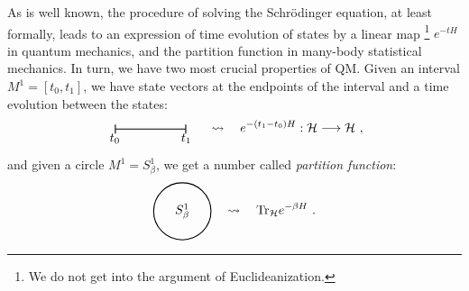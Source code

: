 As is well known, the procedure of solving the Schr\"{o}dinger equation, at least formally, leads
to an expression of time evolution of states by a linear map%
%
\footnote{We do not get into the argument of Euclideanization.}
%
$e^{-tH}$ in quantum mechanics, and the partition function in many-body
statistical mechanics. In turn, we have two most crucial properties
of QM. Given an interval $M^{1}=\left[t_{0},t_{1}\right]$, we have
state vectors at the endpoints of the interval and a time evolution
between the states:
\begin{equation}
    \begin{tikzpicture}[scale=1.0, baseline=(x.base)]    \node (x) at (0,0) {\vphantom{x}};

        \draw[thick, arrows=|-|] (0,0) node[below=0.1] {$t_0$} -- (2,0) node[below=0.1] {$t_1$};

    \end{tikzpicture}
  \quad \rightsquigarrow \quad
  e^{-(t_{1}-t_{0})H} : \mathcal{H}  \longrightarrow  \mathcal{H}
~ ,
\label{eq:qm_linearmap}
\end{equation}
and given a circle $M^{1}=S_{\beta}^{1}$, we get a number called
\emph{partition function}:
\begin{equation}
    \begin{tikzpicture}[scale=0.8, baseline=(x.base)]    \node (x) at (0,0) {\vphantom{x}};

        \draw[thick] (0,0) circle[radius=1cm] node {$S^1_{\beta}$};

    \end{tikzpicture}
  \quad \rightsquigarrow \quad
  \mathrm{Tr}_{\mathcal{H}}  e^{-\beta H}
~ .
\label{eq:qm_number}
\end{equation}


